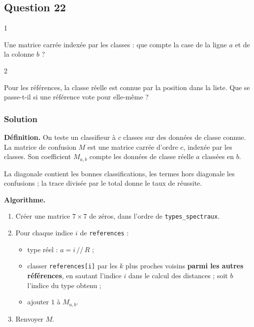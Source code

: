 \documentclass[11pt,a4paper]{article}
\providecommand{\tightlist}{\setlength{\itemsep}{0pt}\setlength{\parskip}{0pt}}
\begin{document}
\hypertarget{question-22}{%
\subsection{Question 22}\label{question-22}}

\begin{indication}{1}

Une matrice carrée indexée par les classes : que compte la case de la ligne \(a\) et de la colonne \(b\) ?

\end{indication}

\begin{indication}{2}

Pour les références, la classe réelle est connue par la position dans la liste. Que se passe-t-il si une référence vote pour elle-même ?

\end{indication}

\hypertarget{solution-21}{%
\subsubsection{Solution}\label{solution-21}}

\textbf{Définition.} On teste un classifieur à \(c\) classes sur des données de classe connue. La matrice de confusion \(M\) est une matrice carrée d'ordre \(c\), indexée par les classes. Son coefficient \(M_{a,b}\) compte les données de classe réelle \(a\) classées en \(b\).

La diagonale contient les bonnes classifications, les termes hors diagonale les confusions ; la trace divisée par le total donne le taux de réussite.

\textbf{Algorithme.}

\begin{enumerate}
\def\labelenumi{\arabic{enumi}.}
\tightlist
\item
  Créer une matrice \(7 \times 7\) de zéros, dans l'ordre de \texttt{types\_spectraux}.
\item
  Pour chaque indice \(i\) de \texttt{references} :

  \begin{itemize}
  \tightlist
  \item
    type réel : \(a = i \,/\!/\, R\) ;
  \item
    classer \texttt{references{[}i{]}} par les \(k\) plus proches voisins \textbf{parmi les autres références}, en sautant l'indice \(i\) dans le calcul des distances ; soit \(b\) l'indice du type obtenu ;
  \item
    ajouter \(1\) à \(M_{a,b}\).
  \end{itemize}
\item
  Renvoyer \(M\).
\end{enumerate}
\end{document}
